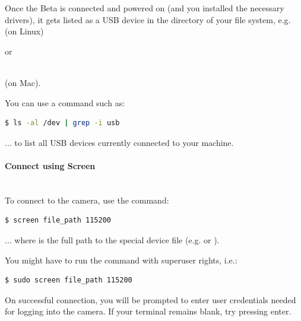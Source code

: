 Once the Beta is connected and powered on (and you installed the necessary drivers), it gets listed as a USB device in the  directory of your file system, e.g.\\

 (on Linux)

or

\\

 (on Mac).

You can use a command such as: 

\begin{lstlisting}[language=bash,morekeywords=$,keywordstyle=\bfseries,frame=none,xleftmargin=.25in,belowskip=2em, aboveskip=2em]
$ ls -al /dev | grep -i usb
\end{lstlisting}

... to list all USB devices currently connected to your machine. 



\paragraph{Connect using Screen}\mbox{}\\
To connect to the camera, use the command: 

\begin{lstlisting}[language=bash,morekeywords=$,keywordstyle=\bfseries,frame=none,xleftmargin=.25in,belowskip=2em, aboveskip=2em]
$ screen file_path 115200
\end{lstlisting}

... where  is the full path to the special device file (e.g.  or ).

You might have to run the command with superuser rights, i.e.: 

\begin{lstlisting}[language=bash,morekeywords=$,keywordstyle=\bfseries,frame=none,xleftmargin=.25in,belowskip=2em, aboveskip=2em]
$ sudo screen file_path 115200
\end{lstlisting}

On successful connection, you will be prompted to enter user credentials needed for logging into the camera.
If your terminal remains blank, try pressing enter.\\

